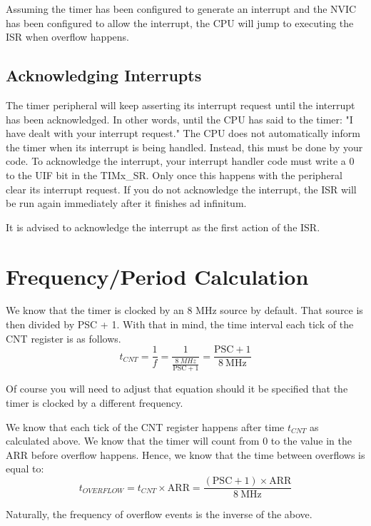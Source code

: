 Assuming the timer has been configured to generate an interrupt and the NVIC has been configured to allow the interrupt, the CPU will jump to executing the ISR when overflow happens.

\subsection{Acknowledging Interrupts} 
The timer peripheral will keep asserting its interrupt request until the interrupt has been acknowledged. 
In other words, until the CPU has said to the timer: "I have dealt with your interrupt request." 
The CPU does not automatically inform the timer when its interrupt is being handled.
Instead, this must be done by your code.
To acknowledge the interrupt, your interrupt handler code must write a 0 to the UIF bit in the TIMx\_SR.
Only once this happens with the peripheral clear its interrupt request.
If you do not acknowledge the interrupt, the ISR will be run again immediately after it finishes ad infinitum. 

It is advised to acknowledge the interrupt as the first action of the ISR.

\section{Frequency/Period Calculation}
We know that the timer is clocked by an 8 MHz source by default. That source is then divided by PSC + 1. With that in mind, the time interval each tick of the CNT register is as follows.
\begin{equation}
    t_{CNT} = \frac{1}{f} = \frac{1}{\frac{\SI{8}{MHz}}{\text{PSC} + 1}} = \frac{\text{PSC} + 1}{\SI{8}{\mega\hertz}}
\end{equation}

Of course you will need to adjust that equation should it be specified that the timer is clocked by a different frequency.

We know that each tick of the CNT register happens after time $t_{CNT}$ as calculated above. We know that the timer will count from 0 to the value in the ARR before overflow happens. 
Hence, we know that the time between overflows is equal to:
\begin{equation}
    t_{OVERFLOW} = t_{CNT} \times \text{ARR} = \frac{(\text{PSC} + 1) \times \text{ARR}}{\SI{8}{\mega\hertz}}
\end{equation}

Naturally, the frequency of overflow events is the inverse of the above.
